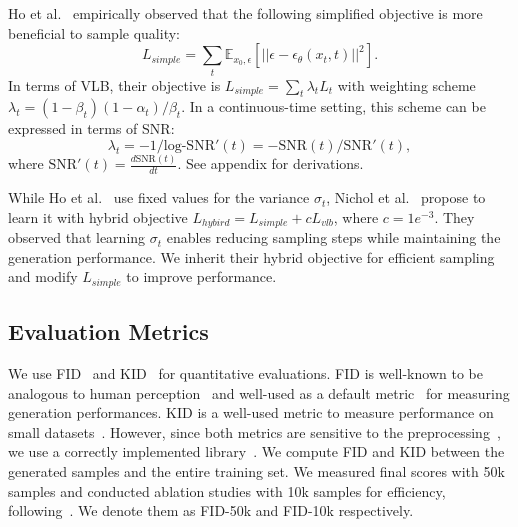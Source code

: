 Ho et al.~\cite{ho2020denoising} empirically observed that the following simplified objective is more beneficial to sample quality:
\begin{equation}\label{eq:simple}
L_{simple}=\sum _t \mathbb{E}_{x_0,\epsilon}[||\epsilon-\epsilon_\theta(x_t, t)||^2].
\end{equation}
In terms of VLB, their objective is $L_{simple}=\sum_t\lambda _t L_t$ with weighting scheme $\lambda _t=(1-\beta _t)(1-\alpha _t)/\beta _t$. In a continuous-time setting, this scheme can be expressed in terms of SNR: 
\begin{equation}\label{eq:simple_snr}
\lambda_t = -1/\text{log-SNR}'(t)= -\text{SNR}(t)/\text{SNR}'(t),
\end{equation}
where $\text{SNR}'(t)=\frac{d\text{SNR}(t)}{dt}$. See appendix for derivations.

While Ho et al.~\cite{ho2020denoising} use fixed values for the variance $\sigma _t$, Nichol et al.~\cite{nichol2021improved} propose to learn it with hybrid objective $L_{hybird}=L_{simple}+c L_{vlb}$, where $c = 1e^{-3}$. They observed that learning $\sigma _t$ enables reducing sampling steps while maintaining the generation performance. 
We inherit their hybrid objective for efficient sampling and modify $L_{simple}$ to improve performance.


\subsection{Evaluation Metrics}
We use FID~\cite{heusel2017gans} and KID~\cite{binkowski2018demystifying} for quantitative evaluations.
FID is well-known to be analogous to human perception~\cite{heusel2017gans} and well-used as a default metric~\cite{karras2020training,dhariwal2021diffusion,stylegan,esser2021taming,parmar2021cleanfid} for measuring generation performances. KID is a well-used metric to measure performance on small datasets~\cite{karras2020training,karras2021alias,parmar2021cleanfid}. However, since both metrics are sensitive to the preprocessing~\cite{parmar2021cleanfid}, we use a correctly implemented library~\cite{parmar2021cleanfid}. We compute FID and KID between the generated samples and the entire training set. We measured final scores with 50k samples and conducted ablation studies with 10k samples for efficiency, following~\cite{dhariwal2021diffusion}. We denote them as FID-50k and FID-10k respectively.
